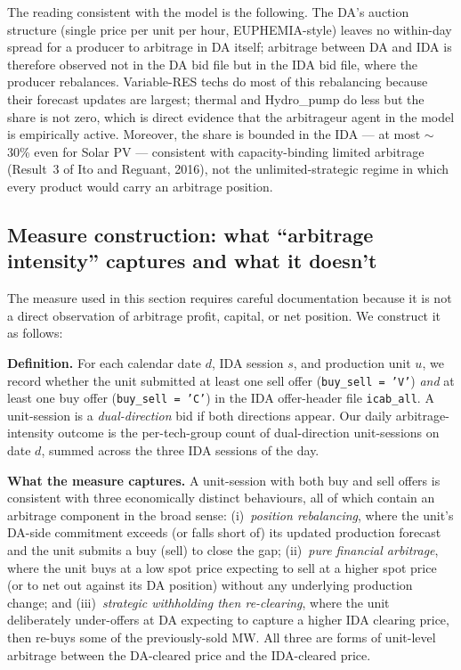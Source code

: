 \documentclass[11pt,a4paper]{article}
\begin{document}
\noindent The reading consistent with the model is the following. The DA's auction structure (single price per unit per hour, EUPHEMIA-style) leaves no within-day spread for a producer to arbitrage in DA itself; arbitrage between DA and IDA is therefore observed not in the DA bid file but in the IDA bid file, where the producer rebalances. Variable-RES techs do most of this rebalancing because their forecast updates are largest; thermal and Hydro\_pump do less but the share is not zero, which is direct evidence that the arbitrageur agent in the model is empirically active. Moreover, the share is bounded in the IDA --- at most $\sim$30\% even for Solar PV --- consistent with capacity-binding limited arbitrage (Result~3 of Ito and Reguant, 2016), not the unlimited-strategic regime in which every product would carry an arbitrage position.

\subsection{Measure construction: what ``arbitrage intensity'' captures and what it doesn't}\label{sec:prov:arbitrage_measure}

The measure used in this section requires careful documentation because it is not a direct observation of arbitrage profit, capital, or net position. We construct it as follows:

\textbf{Definition.} For each calendar date $d$, IDA session $s$, and production unit $u$, we record whether the unit submitted at least one sell offer (\texttt{buy\_sell = 'V'}) \emph{and} at least one buy offer (\texttt{buy\_sell = 'C'}) in the IDA offer-header file \texttt{icab\_all}. A unit-session is a \emph{dual-direction} bid if both directions appear. Our daily arbitrage-intensity outcome is the per-tech-group count of dual-direction unit-sessions on date $d$, summed across the three IDA sessions of the day.

\textbf{What the measure captures.} A unit-session with both buy and sell offers is consistent with three economically distinct behaviours, all of which contain an arbitrage component in the broad sense: (i)~\emph{position rebalancing}, where the unit's DA-side commitment exceeds (or falls short of) its updated production forecast and the unit submits a buy (sell) to close the gap; (ii)~\emph{pure financial arbitrage}, where the unit buys at a low spot price expecting to sell at a higher spot price (or to net out against its DA position) without any underlying production change; and (iii)~\emph{strategic withholding then re-clearing}, where the unit deliberately under-offers at DA expecting to capture a higher IDA clearing price, then re-buys some of the previously-sold MW. All three are forms of unit-level arbitrage between the DA-cleared price and the IDA-cleared price.
\end{document}
